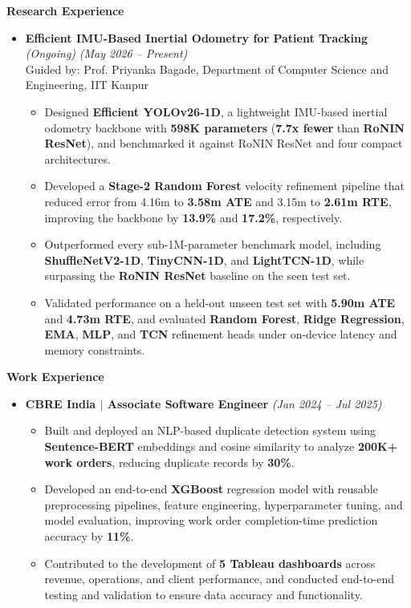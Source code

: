 \documentclass[10pt]{extarticle}
\newcommand{\sectionheader}[1]{
    \vspace{3pt}
    \begin{tcolorbox}
        \textbf{\large #1}
    \end{tcolorbox}
    \vspace{2pt}
}
\begin{document}
\sectionheader{Research Experience}
\begin{itemize}
    \item \textbf{Efficient IMU-Based Inertial Odometry for Patient Tracking} \textit{(Ongoing)} \hfill \textit{(May 2026 -- Present)}\\
    Guided by: Prof. Priyanka Bagade, Department of Computer Science and Engineering, IIT Kanpur
    \begin{itemize}
        \item Designed \textbf{Efficient YOLOv26-1D}, a lightweight IMU-based inertial odometry backbone with \textbf{598K parameters} (\textbf{7.7x fewer} than \textbf{RoNIN ResNet}), and benchmarked it against RoNIN ResNet and four compact architectures.
        \item Developed a \textbf{Stage-2 Random Forest} velocity refinement pipeline that reduced error from 4.16m to \textbf{3.58m ATE} and 3.15m to \textbf{2.61m RTE}, improving the backbone by \textbf{13.9\%} and \textbf{17.2\%}, respectively.
        \item Outperformed every sub-1M-parameter benchmark model, including \textbf{ShuffleNetV2-1D}, \textbf{TinyCNN-1D}, and \textbf{LightTCN-1D}, while surpassing the \textbf{RoNIN ResNet} baseline on the seen test set.
        \item Validated performance on a held-out unseen test set with \textbf{5.90m ATE} and \textbf{4.73m RTE}, and evaluated \textbf{Random Forest}, \textbf{Ridge Regression}, \textbf{EMA}, \textbf{MLP}, and \textbf{TCN} refinement heads under on-device latency and memory constraints.
    \end{itemize}
\end{itemize}

\sectionheader{Work Experience}
\begin{itemize}
    \item \textbf{CBRE India $|$ Associate Software Engineer} \hfill \textit{(Jan 2024 -- Jul 2025)}
    \begin{itemize}
        \item Built and deployed an NLP-based duplicate detection system using \textbf{Sentence-BERT} embeddings and cosine similarity to analyze \textbf{200K+ work orders}, reducing duplicate records by \textbf{30\%}.
        \item Developed an end-to-end \textbf{XGBoost} regression model with reusable preprocessing pipelines, feature engineering, hyperparameter tuning, and model evaluation, improving work order completion-time prediction accuracy by \textbf{11\%}.
        \item Contributed to the development of \textbf{5 Tableau dashboards} across revenue, operations, and client performance, and conducted end-to-end testing and validation to ensure data accuracy and functionality.
    \end{itemize}
\end{itemize}
\end{document}
